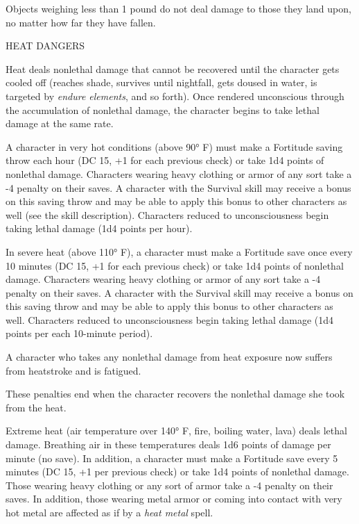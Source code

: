\documentclass{article}
\begin{document}
Objects weighing less than 1 pound do not deal damage to those they land upon, 
no matter how far they have fallen.

\vspace{12pt}
HEAT DANGERS

Heat deals nonlethal damage that cannot be recovered until the character gets cooled 
off (reaches shade, survives until nightfall, gets doused in water, is targeted 
by \textit{endure elements}, and so forth). Once rendered unconscious through the 
accumulation of nonlethal damage, the character begins to take lethal damage at 
the same rate.

A character in very hot conditions (above 90° F) must make a Fortitude saving 
throw each hour (DC 15, +1 for each previous check) or take 1d4 points of nonlethal 
damage. Characters wearing heavy clothing or armor of any sort take a -4 penalty 
on their saves. A character with the Survival skill may receive a bonus on this 
saving throw and may be able to apply this bonus to other characters as well (see 
the skill description). Characters reduced to unconsciousness begin taking lethal 
damage (1d4 points per hour).

In severe heat (above 110° F), a character must make a Fortitude save once every 
10 minutes (DC 15, +1 for each previous check) or take 1d4 points of nonlethal 
damage. Characters wearing heavy clothing or armor of any sort take a -4 penalty 
on their saves. A character with the Survival skill may receive a bonus on this 
saving throw and may be able to apply this bonus to other characters as well. Characters 
reduced to unconsciousness begin taking lethal damage (1d4 points per each 10-minute 
period).

A character who takes any nonlethal damage from heat exposure now suffers from 
heatstroke and is fatigued.

These penalties end when the character recovers the nonlethal damage she took from 
the heat.

Extreme heat (air temperature over 140° F, fire, boiling water, lava) deals lethal 
damage. Breathing air in these temperatures deals 1d6 points of damage per minute 
(no save). In addition, a character must make a Fortitude save every 5 minutes 
(DC 15, +1 per previous check) or take 1d4 points of nonlethal damage. Those wearing 
heavy clothing or any sort of armor take a -4 penalty on their saves. In addition, 
those wearing metal armor or coming into contact with very hot metal are affected 
as if by a \textit{heat metal }spell.
\end{document}
